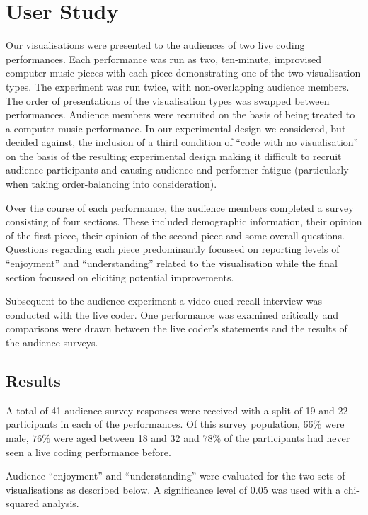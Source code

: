 \documentclass{sig-alternate}
\begin{document}
\section{User Study}

Our visualisations were presented to the audiences of two live coding
performances. Each performance was run as two, ten-minute, improvised
computer music pieces with each piece demonstrating one of the two
visualisation types. The experiment was run twice, with
non-overlapping audience members. The order of presentations of the
visualisation types was swapped between performances. Audience members
were recruited on the basis of being treated to a computer music
performance. In our experimental design we considered, but decided
against, the inclusion of a third condition of ``code with no
visualisation'' on the basis of the resulting experimental design
making it difficult to recruit audience participants and causing
audience and performer fatigue (particularly when taking
order-balancing into consideration).

Over the course of each performance, the audience members completed a
survey consisting of four sections. These included demographic
information, their opinion of the first piece, their opinion of the
second piece and some overall questions. Questions regarding each
piece predominantly focussed on reporting levels of ``enjoyment'' and
``understanding'' related to the visualisation while the final section
focussed on eliciting potential improvements.

Subsequent to the audience experiment a video-cued-recall interview
was conducted with the live coder. One performance was examined
critically and comparisons were drawn between the live coder's
statements and the results of the audience surveys.

\subsection{Results}

A total of 41 audience survey responses were received with a split of
19 and 22 participants in each of the performances. Of this survey
population, $66\%$ were male, $76\%$ were aged between 18 and 32 and
$78\%$ of the participants had never seen a live coding performance
before.

Audience ``enjoyment'' and ``understanding'' were evaluated for the
two sets of visualisations as described below. A significance level of
$0.05$ was used with a chi-squared analysis.
\end{document}
